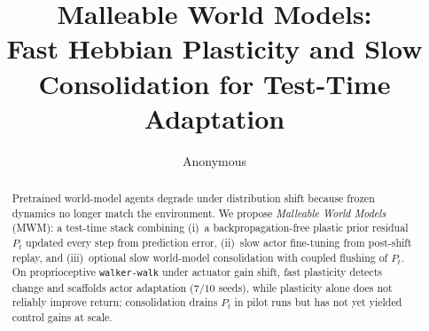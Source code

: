 \documentclass[11pt]{article}
\title{Malleable World Models:\\
  Fast Hebbian Plasticity and Slow Consolidation for Test-Time Adaptation}
\author{Anonymous}
\date{}
\begin{document}
\maketitle

\begin{abstract}
Pretrained world-model agents degrade under distribution shift because frozen dynamics no longer match the environment.
We propose \emph{Malleable World Models} (MWM): a test-time stack combining (i)~a backpropagation-free plastic prior residual $P_t$ updated every step from prediction error, (ii)~slow actor fine-tuning from post-shift replay, and (iii)~optional slow world-model consolidation with coupled flushing of $P_t$.
On proprioceptive \texttt{walker-walk} under actuator gain shift, fast plasticity detects change and scaffolds actor adaptation ($7/10$ seeds), while plasticity alone does not reliably improve return; consolidation drains $P_t$ in pilot runs but has not yet yielded control gains at scale.
\end{abstract}









\end{document}
